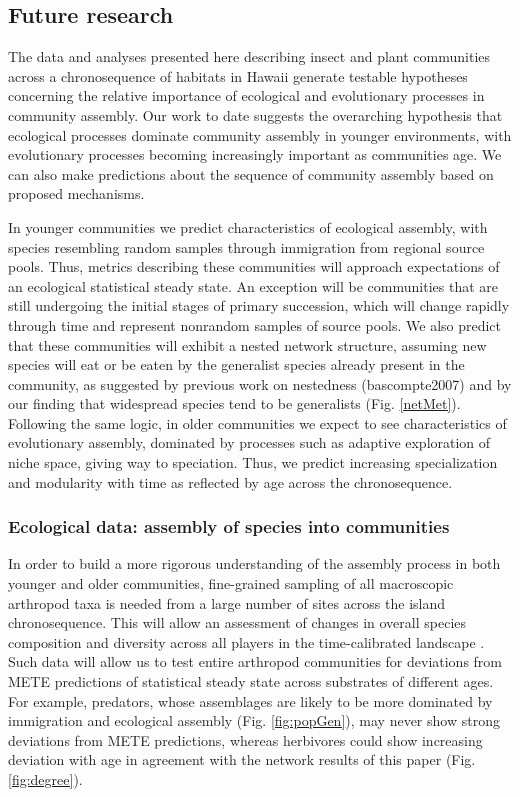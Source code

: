 \subsection{Future research}

The data and analyses presented here describing insect and plant
communities across a chronosequence of habitats in Hawaii generate
testable hypotheses concerning the relative importance of ecological
and evolutionary processes in community assembly. Our work to date
suggests the overarching hypothesis that ecological processes dominate
community assembly in younger environments, with evolutionary
processes becoming increasingly important as communities age. We can
also make predictions about the sequence of community assembly based
on proposed mechanisms.

In younger communities we predict characteristics of ecological
assembly, with species resembling random samples through immigration
from regional source pools. Thus, metrics describing these communities
will approach expectations of an ecological statistical steady
state. An exception will be communities that are still undergoing the
initial stages of primary succession, which will change rapidly
through time and represent nonrandom samples of source pools. We also
predict that these communities will exhibit a nested network
structure, assuming new species will eat or be eaten by the generalist
species already present in the community, as suggested by previous
work on nestedness (bascompte2007) and by our finding that widespread
species tend to be generalists (Fig. \ref{netMet}).  Following the same logic, in
older communities we expect to see characteristics of evolutionary
assembly, dominated by processes such as adaptive exploration of niche
space, giving way to speciation. Thus, we predict increasing
specialization and modularity with time \citep{bascompte2007,
donatti2011, nuismer2013} as reflected by age across the
chronosequence.


\subsubsection{Ecological data: assembly of species into communities}

In order to build a more rigorous understanding of the assembly
process in both younger and older communities, fine-grained sampling
of all macroscopic arthropod taxa is needed from a large number of
sites across the island chronosequence. This will allow an assessment
of changes in overall species composition and diversity across all
players in the time-calibrated landscape \citep{gruner2007}. Such data
will allow us to test entire arthropod communities for deviations from
METE predictions of statistical steady state \citep{harte2011} across
substrates of different ages. For example, predators, whose
assemblages are likely to be more dominated by immigration and
ecological assembly (Fig. \ref{fig:popGen}), may never show strong
deviations from METE predictions, whereas herbivores could show
increasing deviation with age in agreement with the network results of
this paper (Fig. \ref{fig:degree}).


